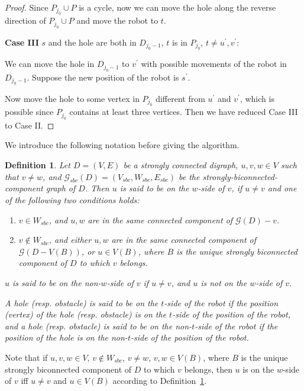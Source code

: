\documentclass{article}
\newtheorem{defn}[thm]{Definition}
\begin{document}
\begin{proof}
Since $P_{j_0} \cup P$ is a cycle, now we can move the hole along
the reverse direction of $P_{j_0} \cup P$ and move the robot to $t$.

\textbf{Case III} $s$ and the hole are both in $D_{j_0-1}$, $t$ is
in $P_{j_0}$, $t \neq u^\prime, v^\prime$:

We can move the hole in $D_{j_0-1}$ to $v^\prime$ with possible
movements of the robot in $D_{j_0-1}$. Suppose the new position of
the robot is $s^\prime$.

Now move the hole to some vertex in $P_{j_0}$ different from
$u^\prime$ and $v^\prime$, which is possible since $P_{j_0}$
contains at least three vertices. Then we have reduced Case III to
Case II.
\end{proof}
\noindent We introduce the following notation before giving the
algorithm.
\begin{defn}\label{defn:w-side-v}
Let $D=(V,E)$ be a strongly connected digraph, $u, v, w \in V$ such
that $v \ne w$, and $\mathcal{G}_{sbc}(D)=(V_{sbc}, W_{sbc},
E_{sbc})$ be the strongly-biconnected-component graph of $D$. Then
$u$ is said to be on the $w$-side of $v$, if $u \ne v$ and one of
the following two conditions holds:
\begin{enumerate}
\item $v \in W_{sbc}$, and $u, w$ are in the same connected component of $\mathcal{G}(D)-v$.

\item $v \not \in W_{sbc}$, and either $u, w$ are in the same connected component of $\mathcal{G}(D-V(B))$, or
$u \in V(B)$, where $B$ is the unique strongly biconnected component
of $D$ to which $v$ belongs.
\end{enumerate}
$u$ is said to be on the non-$w$-side of $v$ if $u \ne v$, and $u$
is not on the $w$-side of $v$.

A hole (resp. obstacle) is said to be on the $t$-side of the robot
if the position (vertex) of the hole (resp. obstacle) is on the
$t$-side of the position of the robot, and a hole (resp. obstacle)
is said to be on the non-$t$-side of the robot if the position of
the hole is on the non-$t$-side of the position of the robot.
\end{defn}


Note that if $u,v,w \in V$, $v \not \in W_{sbc}$, $v \ne w$, $v, w
\in V(B)$, where $B$ is the unique strongly biconnected component of
$D$ to which $v$ belongs, then $u$ is on the $w$-side of $v$ iff $u
\ne v$ and $u \in V(B)$ according to Definition~\ref{defn:w-side-v}.
\end{document}

